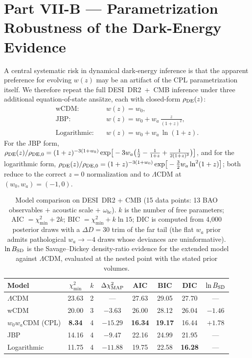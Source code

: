 \section{Part VII-B --- Parametrization Robustness of the Dark-Energy Evidence}
\label{sec:robustness}

A central systematic risk in dynamical dark-energy inference is that the
apparent preference for evolving $w(z)$ may be an artifact of the CPL
parametrization itself. We therefore repeat the full DESI~DR2~+~CMB inference
under three additional equation-of-state ans\"atze, each with closed-form
$\rho_{\rm DE}(z)$:
\begin{align}
\text{wCDM:}\quad & w(z) = w_0, \label{eq:wcdm}\\
\text{JBP:}\quad & w(z) = w_0 + w_a\,\frac{z}{(1+z)^2}, \label{eq:jbp}\\
\text{Logarithmic:}\quad & w(z) = w_0 + w_a\,\ln(1+z). \label{eq:log}
\end{align}
For the JBP form,
$\rho_{\rm DE}(z)/\rho_{{\rm DE},0} = (1+z)^{-3(1+w_0)}
\exp\!\big[-3w_a\big(\tfrac12 - \tfrac{1}{1+z} + \tfrac{1}{2(1+z)^3}\big)\big]$,
and for the logarithmic form,
$\rho_{\rm DE}(z)/\rho_{{\rm DE},0} = (1+z)^{-3(1+w_0)}
\exp\!\big[-\tfrac32 w_a \ln^2(1+z)\big]$;
both reduce to the correct $z=0$ normalization and to $\Lambda$CDM at
$(w_0,w_a)=(-1,0)$.

\begin{table}[h]
\centering
\caption{Model comparison on DESI~DR2 + CMB (15 data points: 13 BAO observables
$+$ acoustic scale $+$ $\omega_{bc}$). $k$ is the number of free parameters;
AIC $=\chi^2_{\min}+2k$; BIC $=\chi^2_{\min}+k\ln 15$; DIC is computed from
4{,}000 posterior draws with a $\Delta D = 30$ trim of the far tail (the flat
$w_a$ prior admits pathological $w_a\to-4$ draws whose deviances are
uninformative). $\ln B_{\rm SD}$ is the Savage--Dickey density-ratio evidence
for the extended model against $\Lambda$CDM, evaluated at the nested point with
the stated prior volumes.}
\begin{tabular}{lccccccc}
\toprule
Model & $\chi^2_{\min}$ & $k$ & $\Delta\chi^2_{\rm MAP}$ & AIC & BIC & DIC & $\ln B_{\rm SD}$ \\
\midrule
$\Lambda$CDM        & 23.63 & 2 & ---            & 27.63 & 29.05 & 27.70 & --- \\
wCDM                & 20.00 & 3 & $-3.63$        & 26.00 & 28.12 & 26.04 & $-1.46$ \\
$w_0w_a$CDM (CPL)   & \textbf{8.34} & 4 & $\mathbf{-15.29}$ & \textbf{16.34} & \textbf{19.17} & 16.44 & $+1.78$ \\
JBP                 & 14.16 & 4 & $-9.47$        & 22.16 & 24.99 & 21.95 & --- \\
Logarithmic         & 11.75 & 4 & $-11.88$       & 19.75 & 22.58 & \textbf{16.28} & --- \\
\bottomrule
\end{tabular}
\label{tab:modelcomp}
\end{table}

